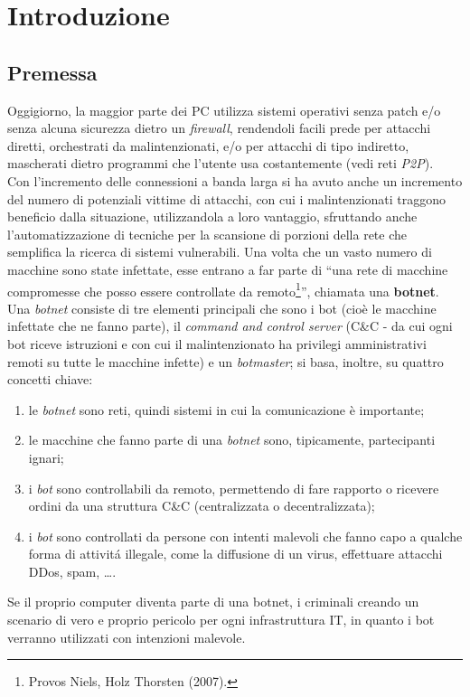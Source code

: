 \chapter{Introduzione}
\section{Premessa}
Oggigiorno, la maggior parte dei PC utilizza sistemi operativi senza patch e/o senza alcuna sicurezza dietro un \textit{firewall}, rendendoli facili prede per attacchi diretti, orchestrati da malintenzionati, e/o per attacchi di tipo indiretto, mascherati dietro programmi che l'utente usa costantemente (vedi reti \textit{P2P}).\\
Con l'incremento delle connessioni a banda larga si ha avuto anche un incremento del numero di potenziali vittime di attacchi, con cui i malintenzionati traggono beneficio dalla situazione, utilizzandola a loro vantaggio, sfruttando anche l'automatizzazione di tecniche per la scansione di porzioni della rete che semplifica la ricerca di sistemi vulnerabili. Una volta che un vasto numero di macchine sono state infettate, esse entrano a far parte di ``una rete di macchine compromesse che posso essere controllate da remoto\footnote{Provos Niels, Holz Thorsten (2007).}'', chiamata una \textbf{botnet}.\\
Una \textit{botnet} consiste di tre elementi principali che sono i bot (cio\`e le macchine infettate che ne fanno parte), il \textit{command and control server} (C\&C - da cui ogni bot riceve istruzioni e con cui il malintenzionato ha privilegi amministrativi remoti su tutte le macchine infette) e un \textit{botmaster}; si basa, inoltre, su quattro concetti chiave:
\begin{enumerate}
\item le \textit{botnet} sono reti, quindi sistemi in cui la comunicazione \`e importante;
\item le macchine che fanno parte di una \textit{botnet} sono, tipicamente, partecipanti ignari;
\item i \textit{bot} sono controllabili da remoto, permettendo di fare rapporto o ricevere ordini da una struttura C\&C (centralizzata o decentralizzata);
\item i \textit{bot} sono controllati da persone con intenti malevoli che fanno capo a qualche forma di attivit\'a illegale, come la diffusione di un virus, effettuare attacchi DDos, spam, \dots .
\end{enumerate}
Se il proprio computer diventa parte di una botnet, i criminali creando un scenario di vero e proprio pericolo per ogni infrastruttura IT, in quanto i bot verranno utilizzati con intenzioni malevole.

